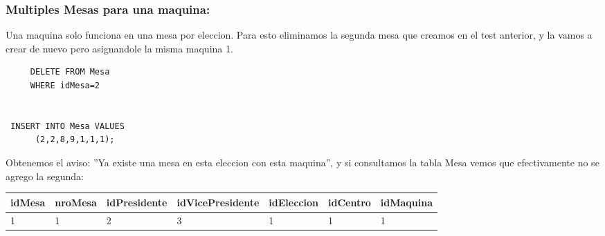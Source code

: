 \subsubsection{Multiples Mesas para una  maquina:} Una maquina solo funciona en una mesa por eleccion. Para esto eliminamos la segunda mesa que creamos en el test anterior, y la vamos a crear de nuevo pero asignandole la misma maquina 1.
	\begin{lstlisting}
	 DELETE FROM Mesa 
 	 WHERE idMesa=2
 	 
 	 
 INSERT INTO Mesa VALUES
 	  (2,2,8,9,1,1,1);
	\end{lstlisting}
			\vspace{2mm}				
Obtenemos el aviso: ''Ya existe una mesa en esta eleccion con esta maquina'', y si consultamos la tabla Mesa vemos que efectivamente no se agrego la segunda:
			\vspace{2mm}	
			
	\begin{tabular}{| l| l| l| l| l| l| l|}
	\hline 
	idMesa & nroMesa & idPresidente & idVicePresidente & idEleccion & idCentro & idMaquina \\
	\hline 
	 1 & 1 & 2 & 3 & 1 & 1 & 1 \\
	\hline 
	\end{tabular}
	
	\vspace{2mm}	
			
